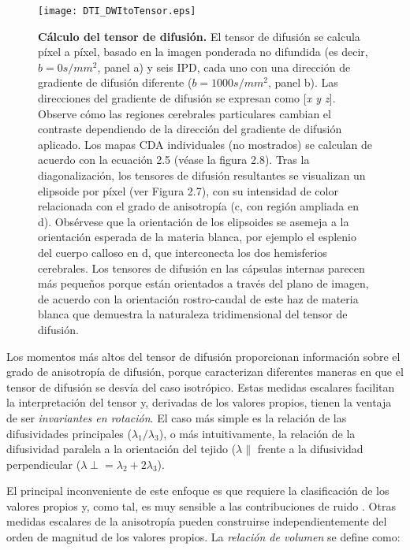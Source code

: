 \documentclass[12pt,a5,twoside]{book}
\begin{document}
\begin{figure}
	\centering
    \texttt{[image: DTI\_DWItoTensor.eps]}
    \caption{\textbf{ Cálculo del tensor de difusión.} El tensor de difusión se calcula píxel a píxel, basado en la imagen ponderada no difundida (es decir, $b = 0 s/mm^{2}$, panel a) y seis IPD, cada uno con una dirección de gradiente de difusión diferente ($b = 1000 s/mm^{2}$, panel b). Las direcciones del gradiente de difusión se expresan como [{\it x y z}]. Observe cómo las regiones cerebrales particulares cambian el contraste dependiendo de la dirección del gradiente de difusión aplicado. Los mapas CDA individuales (no mostrados) se calculan de acuerdo con la ecuación 2.5 (véase la figura 2.8). Tras la diagonalización, los tensores de difusión resultantes se visualizan un elipsoide por píxel (ver Figura 2.7), con su intensidad de color relacionada con el grado de anisotropía (c, con región ampliada en d). Obsérvese que la orientación de los elipsoides se asemeja a la orientación esperada de la materia blanca, por ejemplo el esplenio del cuerpo calloso en d, que interconecta los dos hemisferios cerebrales. Los tensores de difusión en las cápsulas internas parecen más pequeños porque están orientados a través del plano de imagen, de acuerdo con la orientación rostro-caudal de este haz de materia blanca que demuestra la naturaleza tridimensional del tensor de difusión.}
    \label{F:DTI_DWItoTensor}
\end{figure}

Los momentos más altos del tensor de difusión proporcionan información sobre el grado de anisotropía de difusión, porque caracterizan diferentes maneras en que el tensor de difusión se desvía del caso isotrópico. Estas medidas escalares facilitan la interpretación del tensor y, derivadas de los valores propios, tienen la ventaja de ser {\it invariantes en rotación}. El caso más simple es la relación de las difusividades principales ($\lambda_{1}/\lambda_{3}$), o más intuitivamente, la relación de la difusividad paralela a la orientación del tejido ($\lambda\parallel$ frente a la difusividad perpendicular ($\lambda\perp = \lambda_{2} + 2\lambda_{3}$).

El principal inconveniente de este enfoque es que requiere la clasificación de los valores propios y, como tal, es muy sensible a las contribuciones de ruido \citep{Pierpaoli_1996}.
Otras medidas escalares de la anisotropía pueden construirse independientemente del orden de magnitud de los valores propios. La {\it relación de volumen} \citep{Pierpaoli_1996} se define como:
\end{document}
